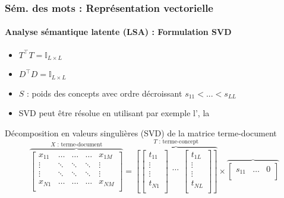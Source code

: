 \documentclass[xcolor=table]{beamer}
\begin{document}
\begin{frame}
	\frametitle{Sém. des mots : Représentation vectorielle}
	\framesubtitle{Analyse sémantique latente (LSA) : Formulation SVD}
	
	\begin{itemize}
		\item $T^\top T = \mathbb{I}_{L \times L}$ 
		\item $D^\top D = \mathbb{I}_{L \times L}$ 
		\item $S$ : poids des concepts avec ordre décroissant $s_{11} < ... < s_{LL}$ 
		\item SVD peut être résolue en utilisant par exemple l', la 
	\end{itemize}
	
	\begin{block}{Décomposition en valeurs singulières (SVD) de la matrice terme-document}
		\scriptsize\bfseries\vspace{-6pt}
		\[
		\overbrace{
			\begin{bmatrix}
			x_{11} & \ldots & \ldots & \ldots & x_{1M} \\ 
			\vdots & \ddots & \ddots & \ddots &\vdots \\
			\vdots & \ddots & \ddots & \ddots &\vdots \\
			x_{N1} & \ldots & \ldots & \ldots & x_{NM} \\ 
			\end{bmatrix}
		}^{X \text{ : terme-document}}
		=
		\overbrace{
			\left[
			\begin{bmatrix}
			t_{11} \\ 
			\vdots \\
			\vdots \\
			t_{N1} \\ 
			\end{bmatrix}
			\begin{matrix}
			\ldots \\ 
			\end{matrix}
			\begin{bmatrix}
			t_{1L} \\ 
			\vdots \\
			\vdots \\
			t_{NL} \\ 
			\end{bmatrix}
			\right]
		}^{T \text{ : terme-concept}}
		\times 
		\overbrace{
			\begin{bmatrix}
			s_{11} & \ldots & 0 \\

\end{bmatrix}}\]
\end{block}
\end{frame}
\end{document}
